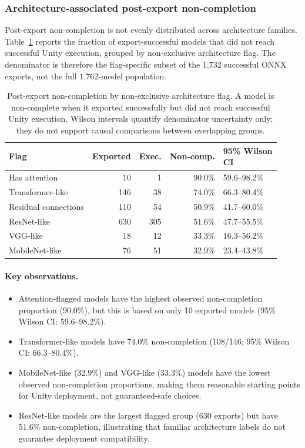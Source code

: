 \documentclass[10pt,twocolumn]{article}
\begin{document}
\subsubsection{Architecture-associated post-export non-completion}

Post-export non-completion is not evenly distributed across architecture families. Table~\ref{tab:families} reports the fraction of export-successful models that did not reach successful Unity execution, grouped by non-exclusive architecture flag. The denominator is therefore the flag-specific subset of the 1,732 successful ONNX exports, not the full 1,762-model population.

\begin{table}[t]
\centering\scriptsize
\setlength{\tabcolsep}{2.5pt}
\begin{tabular}{@{}lrrrl@{}}
\toprule
Flag & Exported & Exec. & Non-comp. & \shortstack{95\% Wilson\\CI} \\
\midrule
Has attention & 10 & 1 & 90.0\% & 59.6--98.2\% \\
Transformer-like & 146 & 38 & 74.0\% & 66.3--80.4\% \\
Residual connections & 110 & 54 & 50.9\% & 41.7--60.0\% \\
ResNet-like & 630 & 305 & 51.6\% & 47.7--55.5\% \\
VGG-like & 18 & 12 & 33.3\% & 16.3--56.2\% \\
MobileNet-like & 76 & 51 & 32.9\% & 23.4--43.8\% \\
\bottomrule
\end{tabular}
\caption{Post-export non-completion by non-exclusive architecture flag. A model is non-complete when it exported successfully but did not reach successful Unity execution. Wilson intervals quantify denominator uncertainty only; they do not support causal comparisons between overlapping groups.}
\label{tab:families}
\end{table}

\paragraph{Key observations.}
\begin{itemize}[nosep,leftmargin=*]
  \item Attention-flagged models have the highest observed non-completion proportion (90.0\%), but this is based on only 10 exported models (95\% Wilson CI: 59.6--98.2\%).
  \item Transformer-like models have 74.0\% non-completion (108/146; 95\% Wilson CI: 66.3--80.4\%).
  \item MobileNet-like (32.9\%) and VGG-like (33.3\%) models have the lowest observed non-completion proportions, making them reasonable starting points for Unity deployment, not guaranteed-safe choices.
  \item ResNet-like models are the largest flagged group (630 exports) but have 51.6\% non-completion, illustrating that familiar architecture labels do not guarantee deployment compatibility.
\end{itemize}
\end{document}
